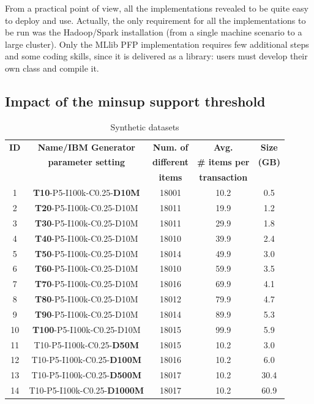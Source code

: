 From a practical point of view, all the implementations revealed to be quite easy to deploy and use. 
Actually, the only requirement for all the implementations to be run was the Hadoop/Spark installation 
(from a single machine scenario to a large cluster). 
Only the MLlib PFP implementation requires few additional steps and some coding skills, since it is delivered as a library: 
users must develop their own class and compile it.


\subsection{Impact of the minsup support threshold}
\label{survey_minsup_exp}

\begin{table}[t]
\scriptsize
\begin{center}
\caption{Synthetic datasets}
\label{survey_datasets_transactions}
\begin{tabular}{|c|c|c|c|c|}
\hline
{\bf ID }& {\bf Name/IBM Generator} &  {\bf Num. of} & {\bf  Avg.} & {\bf Size} \\
{\bf  }& {\bf  parameter setting} &  {\bf different} & {\bf \# items per } & {\bf (GB) } \\
{\bf  } & {\bf } & {\bf items} & {\bf  transaction } & {\bf } \\ \hline
 \hline
1 & \textbf{T10}-P5-I100k-C0.25-\textbf{D10M} &  18001 & 10.2 &  0.5 \\ \hline
2  & \textbf{T20}-P5-I100k-C0.25-D10M  & 18011 & 19.9 & 1.2 \\ \hline
3  & \textbf{T30}-P5-I100k-C0.25-D10M  & 18011 & 29.9 & 1.8 \\ \hline
4 & \textbf{T40}-P5-I100k-C0.25-D10M  & 18010 & 39.9 & 2.4 \\ \hline
5 & \textbf{T50}-P5-I100k-C0.25-D10M  & 18014 & 49.9 & 3.0 \\ \hline
6 & \textbf{T60}-P5-I100k-C0.25-D10M  & 18010 & 59.9 & 3.5 \\ \hline
7 & \textbf{T70}-P5-I100k-C0.25-D10M  & 18016 & 69.9 & 4.1 \\ \hline
8 & \textbf{T80}-P5-I100k-C0.25-D10M  & 18012 & 79.9 & 4.7 \\ \hline
9 & \textbf{T90}-P5-I100k-C0.25-D10M  & 18014 & 89.9 & 5.3 \\ \hline
10 & \textbf{T100}-P5-I100k-C0.25-D10M & 18015 & 99.9 & 5.9 \\ \hline
11 & T10-P5-I100k-C0.25-\textbf{D50M} &  18015 & 10.2 & 3.0 \\ \hline
12 & T10-P5-I100k-C0.25-\textbf{D100M} &  18016 & 10.2 & 6.0 \\ \hline
13 & T10-P5-I100k-C0.25-\textbf{D500M} &  18017 & 10.2 &  30.4 \\ \hline
14 & T10-P5-I100k-C0.25-\textbf{D1000M} &  18017 & 10.2 &  60.9 \\ \hline
\end{tabular}
\end{center}
\end{table}




